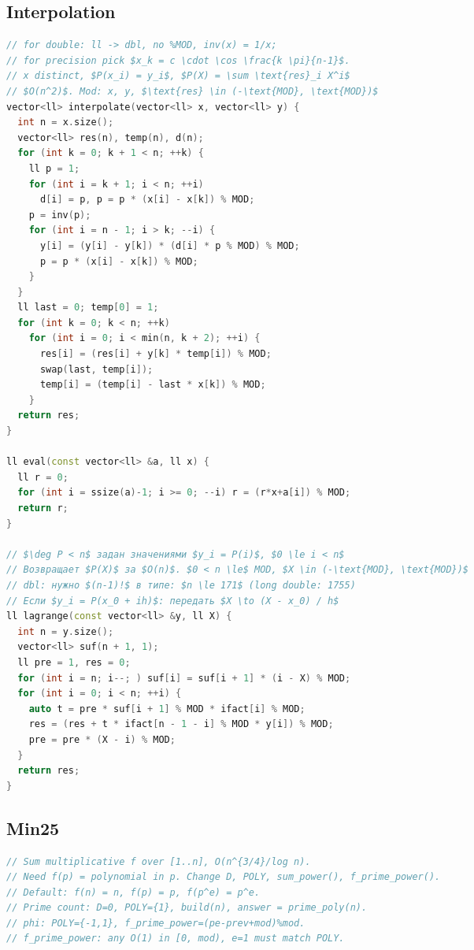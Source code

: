 \documentclass[8pt,a4paper,landscape,twosided]{extarticle}
\begin{document}
\begin{multicols*}{3}
\subsection{Interpolation}
\begin{lstlisting}[language=C++]
// for double: ll -> dbl, no %MOD, inv(x) = 1/x;
// for precision pick $x_k = c \cdot \cos \frac{k \pi}{n-1}$.
// x distinct, $P(x_i) = y_i$, $P(X) = \sum \text{res}_i X^i$
// $O(n^2)$. Mod: x, y, $\text{res} \in (-\text{MOD}, \text{MOD})$
vector<ll> interpolate(vector<ll> x, vector<ll> y) {
  int n = x.size();
  vector<ll> res(n), temp(n), d(n);
  for (int k = 0; k + 1 < n; ++k) {
    ll p = 1;
    for (int i = k + 1; i < n; ++i)
      d[i] = p, p = p * (x[i] - x[k]) % MOD;
    p = inv(p);
    for (int i = n - 1; i > k; --i) {
      y[i] = (y[i] - y[k]) * (d[i] * p % MOD) % MOD;
      p = p * (x[i] - x[k]) % MOD;
    }
  }
  ll last = 0; temp[0] = 1;
  for (int k = 0; k < n; ++k)
    for (int i = 0; i < min(n, k + 2); ++i) {
      res[i] = (res[i] + y[k] * temp[i]) % MOD;
      swap(last, temp[i]);
      temp[i] = (temp[i] - last * x[k]) % MOD;
    }
  return res;
}

ll eval(const vector<ll> &a, ll x) {
  ll r = 0;
  for (int i = ssize(a)-1; i >= 0; --i) r = (r*x+a[i]) % MOD;
  return r;
}

// $\deg P < n$ задан значениями $y_i = P(i)$, $0 \le i < n$
// Возвращает $P(X)$ за $O(n)$. $0 < n \le$ MOD, $X \in (-\text{MOD}, \text{MOD})$
// dbl: нужно $(n-1)!$ в типе: $n \le 171$ (long double: 1755)
// Если $y_i = P(x_0 + ih)$: передать $X \to (X - x_0) / h$
ll lagrange(const vector<ll> &y, ll X) {
  int n = y.size();
  vector<ll> suf(n + 1, 1);
  ll pre = 1, res = 0;
  for (int i = n; i--; ) suf[i] = suf[i + 1] * (i - X) % MOD;
  for (int i = 0; i < n; ++i) {
    auto t = pre * suf[i + 1] % MOD * ifact[i] % MOD;
    res = (res + t * ifact[n - 1 - i] % MOD * y[i]) % MOD;
    pre = pre * (X - i) % MOD;
  }
  return res;
}
\end{lstlisting}

\subsection{Min25}
\begin{lstlisting}[language=C++]
// Sum multiplicative f over [1..n], O(n^{3/4}/log n).
// Need f(p) = polynomial in p. Change D, POLY, sum_power(), f_prime_power().
// Default: f(n) = n, f(p) = p, f(p^e) = p^e.
// Prime count: D=0, POLY={1}, build(n), answer = prime_poly(n).
// phi: POLY={-1,1}, f_prime_power=(pe-prev+mod)%mod.
// f_prime_power: any O(1) in [0, mod), e=1 must match POLY.


\end{lstlisting}
\end{multicols*}
\end{document}
